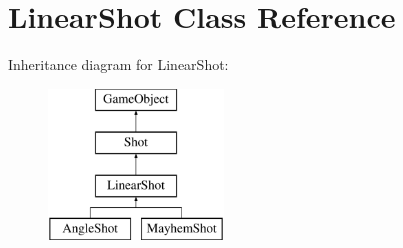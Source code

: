 \hypertarget{class_linear_shot}{\section{Linear\-Shot Class Reference}
\label{class_linear_shot}
}
Inheritance diagram for Linear\-Shot\-:\begin{figure}[H]
\begin{center}
\leavevmode
\includegraphics[height=4.000000cm]{class_linear_shot}
\end{center}
\end{figure}
